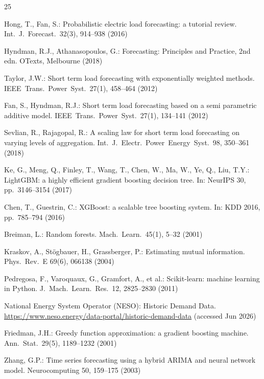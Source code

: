 \documentclass[runningheads]{llncs}
\begin{document}
\begin{thebibliography}{25}
\small
\setlength{\itemsep}{0pt}
\setlength{\parskip}{0pt}

Hong, T., Fan, S.: Probabilistic electric load forecasting: a tutorial review. Int.\ J.\ Forecast.\ 32(3), 914--938 (2016)

Hyndman, R.J., Athanasopoulos, G.: Forecasting: Principles and Practice, 2nd edn. OTexts, Melbourne (2018)

Taylor, J.W.: Short term load forecasting with exponentially weighted methods. IEEE\ Trans.\ Power\ Syst.\ 27(1), 458--464 (2012)

Fan, S., Hyndman, R.J.: Short term load forecasting based on a semi parametric additive model. IEEE\ Trans.\ Power\ Syst.\ 27(1), 134--141 (2012)

Sevlian, R., Rajagopal, R.: A scaling law for short term load forecasting on varying levels of aggregation. Int.\ J.\ Electr.\ Power\ Energy\ Syst.\ 98, 350--361 (2018)

Ke, G., Meng, Q., Finley, T., Wang, T., Chen, W., Ma, W., Ye, Q., Liu, T.Y.: {LightGBM}: a highly efficient gradient boosting decision tree. In: NeurIPS 30, pp.\ 3146--3154 (2017)

Chen, T., Guestrin, C.: {XGBoost}: a scalable tree boosting system. In: KDD 2016, pp.\ 785--794 (2016)

Breiman, L.: Random forests. Mach.\ Learn.\ 45(1), 5--32 (2001)

Kraskov, A., St{\"o}gbauer, H., Grassberger, P.: Estimating mutual information. Phys.\ Rev.\ E 69(6), 066138 (2004)

Pedregosa, F., Varoquaux, G., Gramfort, A., et al.: Scikit-learn: machine learning in {P}ython. J.\ Mach.\ Learn.\ Res.\ 12, 2825--2830 (2011)

National Energy System Operator ({NESO}): Historic Demand Data. \url{https://www.neso.energy/data-portal/historic-demand-data} (accessed Jun 2026)

Friedman, J.H.: Greedy function approximation: a gradient boosting machine. Ann.\ Stat.\ 29(5), 1189--1232 (2001)

Zhang, G.P.: Time series forecasting using a hybrid {ARIMA} and neural network model. Neurocomputing 50, 159--175 (2003)


\end{thebibliography}
\end{document}
